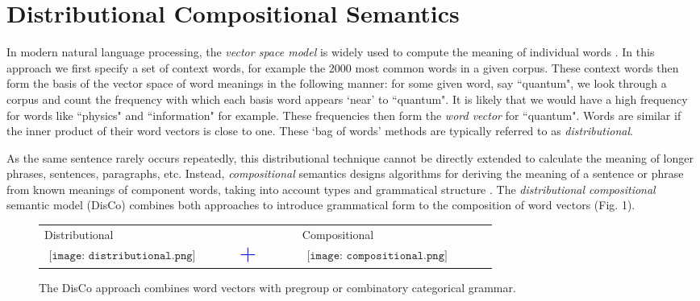 \section{Distributional Compositional Semantics}
\label{sec:disco}
In modern natural language processing, the \emph{vector space model} is widely used to compute the meaning of individual words \cite{schutze1998automatic}. In this approach we first specify a set of context words, for example the 2000 most common words in a given corpus.  These context words then form the basis of the vector space of word meanings in the following manner: for some given word, say  ``quantum", we look through a corpus and count the frequency with which each basis word    appears `near' to ``quantum". It is likely that we would have a high frequency for words like ``physics" and ``information" for example.  These frequencies then form the \emph{word vector} for ``quantum". Words are similar if the inner product of their word vectors is close to one. These `bag of words' methods are typically referred to as \emph{distributional}.

As the same sentence rarely occurs repeatedly, this distributional technique cannot be directly extended to calculate the meaning of longer phrases, sentences, paragraphs, etc. Instead, \emph{compositional} semantics designs algorithms for deriving the meaning of a sentence or phrase from known meanings of component words,  taking into account types and grammatical structure \cite{lambek2008word}. The \emph{distributional compositional} semantic model\cite{clark2008compositional} (DisCo) combines both approaches to introduce grammatical form to the composition of word vectors (Fig. 1). 

\begin{figure}[ht]
\label{fig:discofig}
\begin{center}
\begin{tabular}{m{0.31\linewidth}@{}m{0.1\linewidth}@{}m{0.31\linewidth}}
 Distributional & & Compositional \\
 $\begin{aligned}
 \texttt{[image: distributional.png]}
 \end{aligned}$
 & $\begin{aligned}\mbox{{\color{blue} \huge +}}\end{aligned}$ & 
  $\begin{aligned}
 \texttt{[image: compositional.png]}
 \end{aligned}$
\end{tabular}
\end{center}
\caption{The DisCo approach combines word vectors with pregroup or combinatory categorical grammar.}
\end{figure}

